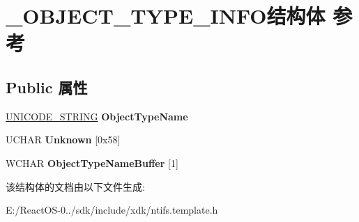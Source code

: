 \hypertarget{struct___o_b_j_e_c_t___t_y_p_e___i_n_f_o}{}\section{\+\_\+\+O\+B\+J\+E\+C\+T\+\_\+\+T\+Y\+P\+E\+\_\+\+I\+N\+F\+O结构体 参考}
\label{struct___o_b_j_e_c_t___t_y_p_e___i_n_f_o}
\subsection*{Public 属性}
\begin{DoxyCompactItemize}
\item 
\mbox{\label{struct___o_b_j_e_c_t___t_y_p_e___i_n_f_o_a4acbb8ae79fa89c41322101d1035550c}} 
\hyperlink{struct___u_n_i_c_o_d_e___s_t_r_i_n_g}{U\+N\+I\+C\+O\+D\+E\+\_\+\+S\+T\+R\+I\+NG} {\bfseries Object\+Type\+Name}
\item 
\mbox{\label{struct___o_b_j_e_c_t___t_y_p_e___i_n_f_o_aa828654e96b103451c8b2393a01a841d}} 
U\+C\+H\+AR {\bfseries Unknown} \mbox{[}0x58\mbox{]}
\item 
\mbox{\label{struct___o_b_j_e_c_t___t_y_p_e___i_n_f_o_a112169d1ec388a3ae88eb08637a6db58}} 
W\+C\+H\+AR {\bfseries Object\+Type\+Name\+Buffer} \mbox{[}1\mbox{]}
\end{DoxyCompactItemize}


该结构体的文档由以下文件生成\+:\begin{DoxyCompactItemize}
\item 
E\+:/\+React\+O\+S-\/0../sdk/include/xdk/ntifs.\+template.\+h\end{DoxyCompactItemize}

